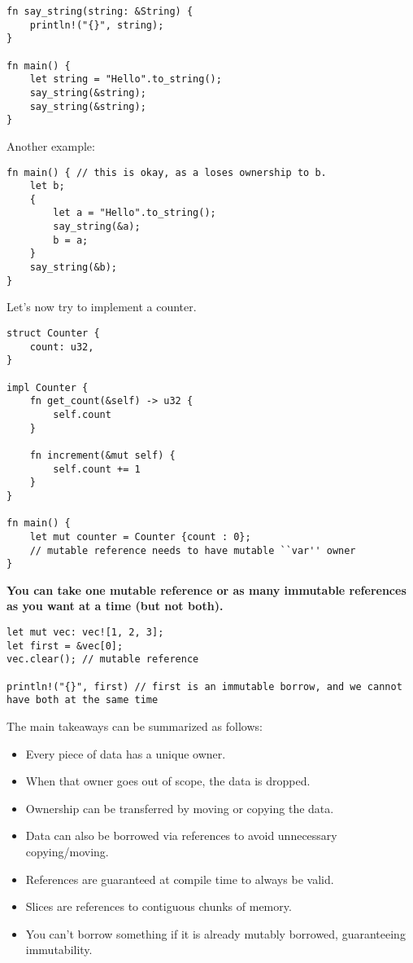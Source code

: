 \begin{lstlisting}[frame = none]
fn say_string(string: &String) {
    println!("{}", string);
}

fn main() {
    let string = "Hello".to_string();
    say_string(&string);
    say_string(&string);
}
\end{lstlisting} 
    
Another example:
\begin{lstlisting}[frame = none]
fn main() { // this is okay, as a loses ownership to b.
    let b;
    {
        let a = "Hello".to_string();
        say_string(&a);
        b = a;
    }
    say_string(&b);
}
\end{lstlisting}

Let's now try to implement a counter.

\begin{lstlisting}[frame = none]
struct Counter {
    count: u32,
}

impl Counter {
    fn get_count(&self) -> u32 {
        self.count
    }

    fn increment(&mut self) {
        self.count += 1
    }
}

fn main() {
    let mut counter = Counter {count : 0}; 
    // mutable reference needs to have mutable ``var'' owner
}
\end{lstlisting}

\textbf{You can take one mutable reference or as many immutable references as you want at a time (but not both).}

\begin{lstlisting}[frame = none]
let mut vec: vec![1, 2, 3];
let first = &vec[0];
vec.clear(); // mutable reference

println!("{}", first) // first is an immutable borrow, and we cannot have both at the same time
\end{lstlisting}

The main takeaways can be summarized as follows: \vspace{-0.1cm}\begin{itemize}
\item Every piece of data has a unique owner.
\item When that owner goes out of scope, the data is dropped.
\item Ownership can be transferred by moving or copying the data.
\item Data can also be borrowed via references to avoid unnecessary copying/moving.
\item References are guaranteed at compile time to always be valid.
\item Slices are references to contiguous chunks of memory.
\item You can't borrow something if it is already mutably borrowed, guaranteeing immutability.
\end{itemize}
